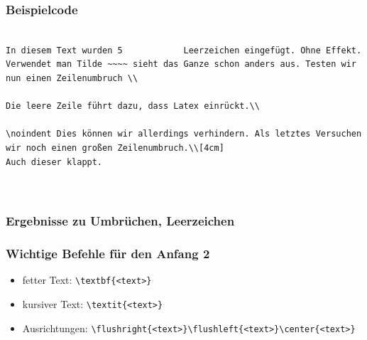 \begin{frame}[fragile]
\frametitle{Beispielcode}
 \begin{lstlisting}[style=Latex]

In diesem Text wurden 5            Leerzeichen eingefügt. Ohne Effekt. 
Verwendet man Tilde ~~~~ sieht das Ganze schon anders aus. Testen wir nun einen Zeilenumbruch \\ 

Die leere Zeile führt dazu, dass Latex einrückt.\\

\noindent Dies können wir allerdings verhindern. Als letztes Versuchen wir noch einen großen Zeilenumbruch.\\[4cm]
Auch dieser klappt.



\end{lstlisting} 
\end{frame}
\begin{frame}[fragile,t]\vspace{-15pt}
\frametitle{Ergebnisse zu Umbrüchen, Leerzeichen}
\end{frame}
\begin{frame}[fragile]
\frametitle{Wichtige Befehle für den Anfang 2}
\linespread{1.5}
\begin{itemize}
\item fetter Text: \lstinline[style=Latex]+\textbf{<text>}+ \\
\item kursiver Text:  \lstinline[style=Latex]+\textit{<text>}+
\item Ausrichtungen:  \lstinline[style=Latex]+\flushright{<text>}\flushleft{<text>}\center{<text>}+
\end{itemize}
\end{frame}

